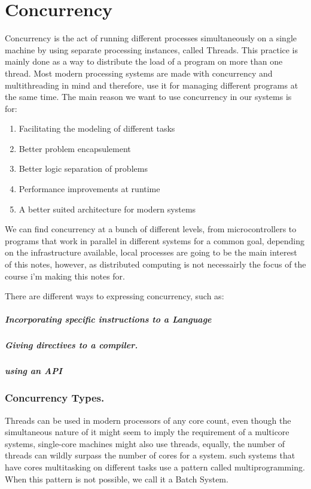 \documentclass[12pt,a4paper,teal]{bbe}
\begin{document}
	
	\chapter{Concurrency}
	Concurrency is the act of running different processes simultaneously 
	on a single machine by using separate processing instances, called Threads. 
	This practice is mainly done as a way to distribute the load 
	of a program on more than one thread. Most modern processing systems are made with
	concurrency and multithreading in mind and therefore, use it for managing different programs at
	the same time. The main reason we want to use concurrency in our systems is for:
	
	\begin{enumerate}
	
		\item Facilitating the modeling of different tasks
		\item Better problem encapsulement
		\item Better logic separation of problems
		\item Performance improvements at runtime
		\item A better suited architecture for modern systems 
	\end{enumerate}
	
	We can find concurrency at a bunch of different levels, from microcontrollers
	to programs that work in parallel in different systems for a common goal, depending
	on the infrastructure available, local processes are going to be the main interest
	of this notes, however, as distributed computing is not necessairly the focus of
	the course i'm making this notes for.

	There are different ways to expressing concurrency, such as:
	\paragraph{Incorporating specific instructions to a Language}

	\paragraph{Giving directives to a compiler.}

	\paragraph{using an API}

	\subsection{Concurrency Types.}
	Threads can be used in modern processors of any core count, even though 
	the simultaneous nature of it might seem to imply the requirement of a
	multicore systems, single-core machines might
	also use threads, equally, the number of threads can wildly surpass the number
	of cores for a system. such systems that have cores multitasking on different
	tasks use a pattern called multiprogramming. When this pattern is not possible,
	we call it a Batch System.
	
\end{document}
